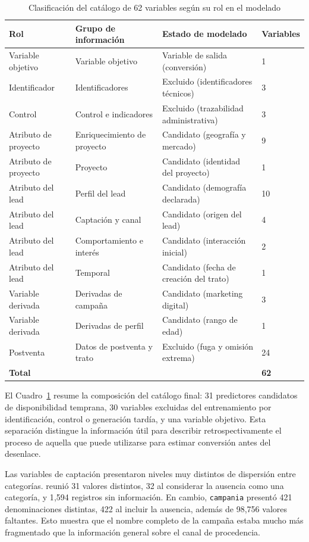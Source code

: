 \begin{table}[H]
\centering
\caption{Clasificación del catálogo de 62 variables según su rol en el modelado}
\label{tab:resumen-variables}
\small
\begin{tabular}{p{2.6cm}p{4.1cm}p{5.4cm}p{1.7cm}}
\hline
\textbf{Rol} & \textbf{Grupo de información} & \textbf{Estado de modelado} & \textbf{Variables} \\ \hline
Variable objetivo & Variable objetivo & Variable de salida (conversión) & 1 \\
Identificador & Identificadores & Excluido (identificadores técnicos) & 3 \\
Control & Control e indicadores & Excluido (trazabilidad administrativa) & 3 \\
Atributo de proyecto & Enriquecimiento de proyecto & Candidato (geografía y mercado) & 9 \\
Atributo de proyecto & Proyecto & Candidato (identidad del proyecto) & 1 \\
Atributo del lead & Perfil del lead & Candidato (demografía declarada) & 10 \\
Atributo del lead & Captación y canal & Candidato (origen del lead) & 4 \\
Atributo del lead & Comportamiento e interés & Candidato (interacción inicial) & 2 \\
Atributo del lead & Temporal & Candidato (fecha de creación del trato) & 1 \\
Variable derivada & Derivadas de campaña & Candidato (marketing digital) & 3 \\
Variable derivada & Derivadas de perfil & Candidato (rango de edad) & 1 \\
Postventa & Datos de postventa y trato & Excluido (fuga y omisión extrema) & 24 \\ \hline
\textbf{Total} & & & \textbf{62} \\ \hline
\end{tabular}
\fuentepropia
\end{table}

El Cuadro~\ref{tab:resumen-variables} resume la composición del catálogo final: 31 predictores candidatos de disponibilidad temprana, 30 variables excluidas del entrenamiento por identificación, control o generación tardía, y una variable objetivo. Esta separación distingue la información útil para describir retrospectivamente el proceso de aquella que puede utilizarse para estimar conversión antes del desenlace.

Las variables de captación presentaron niveles muy distintos de dispersión entre categorías.  reunió 31 valores distintos, 32 al considerar la ausencia como una categoría, y 1{,}594 registros sin información. En cambio, \texttt{campania} presentó 421 denominaciones distintas, 422 al incluir la ausencia, además de 98{,}756 valores faltantes. Esto muestra que el nombre completo de la campaña estaba mucho más fragmentado que la información general sobre el canal de procedencia.


